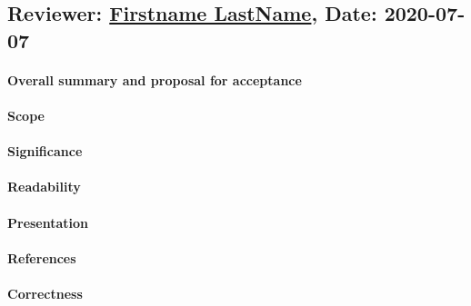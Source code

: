 \documentclass{jhps}
\begin{document}


\reviews   %

\subsection*{Reviewer: \href{Optional URL to reviewer page}{Firstname LastName}, Date: 2020-07-07}

\paragraph{Overall summary and proposal for acceptance}

\paragraph{Scope}   %

\paragraph{Significance}   %

\paragraph{Readability}   %

\paragraph{Presentation}

\paragraph{References}   %

\paragraph{Correctness}   %
\end{document}
